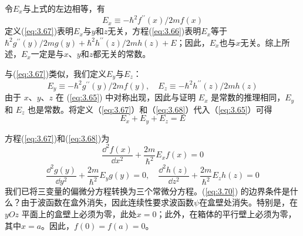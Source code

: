 	令$E_x$与上式的左边相等，有
	\begin{equation}
		E_x \equiv -\hbar^2f^{\prime\prime}\left(x\right)/2mf\left(x\right)
		\label{eq:3.67}
	\end{equation}
	定义(\ref{eq:3.67})表明$E_x$与$y$和$z$无关，方程(\ref{eq:3.66})表明$E_x$等于$\hbar^2g^{\prime\prime}\left(y\right)/2mg\left(y\right)+\hbar^2h^{\prime\prime}\left(z\right)/2mh\left(z\right)+E$；因此，$E_x$也与$x$无关。综上所述，$E_x$一定是与$x$、$y$和$z$都无关的常数。

	与(\ref{eq:3.67})类似，我们定义$E_y$与$E_z$：
	\begin{equation}
		E_y \equiv -\hbar^2g^{\prime\prime}\left(y\right)/2mf\left(y\right), \quad E_z \equiv -\hbar^2h^{\prime\prime}\left(z\right)/2mh\left(z\right)
		\label{eq:3.68}
	\end{equation}
	由于 $x$、$y$、$z$ 在 (\ref{eq:3.65}) 中对称出现，因此与证明 $E_x$ 是常数的推理相同，$E_y$ 和 $E_z$ 也是常数。将定义（\ref{eq:3.67}）和（\ref{eq:3.68}）代入（\ref{eq:3.65}）可得
	\begin{equation}
		E_x+E_y+E_z=E
		\label{eq:3.69}
	\end{equation}

	方程(\ref{eq:3.67})和(\ref{eq:3.68})为
	\begin{equation}
		\frac{\dd ^2f\left(x\right)}{\dd x^2}+\frac{2m}{\hbar^2}E_xf\left(x\right) = 0
		\label{eq:3.70}
	\end{equation}
	\begin{equation}
		\frac{\dd ^2g\left(y\right)}{\dd y^2}+\frac{2m}{\hbar^2}E_yg\left(y\right) = 0, \quad \frac{\dd ^2h\left(z\right)}{\dd z^2}+\frac{2m}{\hbar^2}E_zh\left(z\right) = 0
		\label{eq:3.71}
	\end{equation}
	我们已将三变量的偏微分方程转换为三个常微分方程。(\ref{eq:3.70}) 的边界条件是什么？由于波函数在盒外消失，因此连续性要求波函数$\psi$在盒壁处消失。特别是，在 $yOz$ 平面上的盒壁上必须为零，此处$x=0$；此外，在箱体的平行壁上必须为零，其中$x=a$。因此，$f\left(0\right) = f\left(a\right) = 0$。


